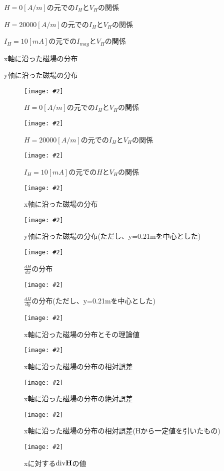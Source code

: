 \documentclass[uplatex,11pt]{jsarticle}
\newcommand{\cir}[3]{ %
    \begin{figure}
        \begin{center}
            \texttt{[image: \#2]}
            \caption{#3}
            \label{fg_#1}
         \end{center}
    \end{figure}
}
\newcommand{\tab}[4]{ %
    \begin{table}[htb]
        \centering
        \caption{#3}
        
        \label{tab_#1}
    \end{table}
}
\begin{document}
\tab{a_2}{./csv/jikken_a_2.csv}{ $H=0[A/m]$の元での$I_H$と$V_H$の関係 }{1}
\tab{a_3}{./csv/jikken_a_3.csv}{ $H=20000[A/m]$の元での$I_H$と$V_H$の関係 }{1}
\tab{a_4}{./csv/jikken_a_4.csv}{ $I_H = 10[mA]$の元での$I_{mag}$と$V_H$の関係 }{1}

\tab{b_1}{./csv/jikken_b_1.csv}{x軸に沿った磁場の分布}{3}
\tab{b_2}{./csv/jikken_b_2.csv}{y軸に沿った磁場の分布}{3}

\clearpage

\cir{a_2}{./graph/jikken_a_2.png}{ $ H=0[A/m] $の元での$I_H$と$V_H$の関係 }
\cir{a_3}{./graph/jikken_a_3.png}{ $ H=20000[A/m] $の元での$I_H$と$V_H$の関係 }
\cir{a_4}{./graph/jikken_a_4.png}{ $ I_H = 10[mA] $の元での$H$と$V_H$の関係 }

\cir{b_1}{./graph/jikken_b_1.png}{ x軸に沿った磁場の分布 }
\cir{b_2}{./graph/jikken_b_2.png}{ y軸に沿った磁場の分布(ただし、y=0.21mを中心とした) }

\cir{b_1_differential}{./graph/jikken_b_1_differential.png}{ $\frac{dH}{dx}$の分布 }
\cir{b_2_differential}{./graph/jikken_b_2_differential.png}{ $\frac{dH}{dy}$の分布(ただし、y=0.21mを中心とした) }

\cir{b_1_theoretical_comparizon}{./graph/jikken_b_1_theoretical_comparizon.png}{ x軸に沿った磁場の分布とその理論値 }
\cir{b_1_relative_error}{./graph/jikken_b_1_relative_error.png}{ x軸に沿った磁場の分布の相対誤差 }
\cir{b_1_absolute_error}{./graph/jikken_b_1_absolute_error.png}{ x軸に沿った磁場の分布の絶対誤差 }

\cir{b_1_relative_error_with_offset}{./graph/jikken_b_1_relative_error_with_offset.png}{ x軸に沿った磁場の分布の相対誤差(Hから一定値を引いたもの) }

\cir{x_divH}{./graph/x_divH.png}{ xに対する${\rm div} {\bf H}$の値 }
\end{document}
